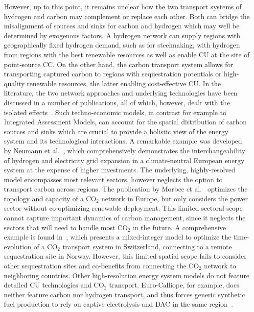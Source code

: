 \documentclass[twocolumn]{article}
\newcommand{\COtwo}{CO$_2$}
\begin{document}
However, up to this point, it remains unclear how the two transport systems of hydrogen and carbon may complement or replace each other. Both can bridge the misalignment of sources and sinks for carbon and hydrogen which may well be determined by exogenous factors. A hydrogen network can supply regions with geographically fixed hydrogen demand, such as for steelmaking, with hydrogen from regions with the best renewable resources as well as enable CU at the site of point-source CC. On the other hand, the carbon transport system allows for transporting captured carbon to regions with sequestration potentials or high-quality renewable resources, the latter enabling cost-effective CU.
In the literature, the two network approaches and underlying technologies have been discussed in a number of publications, all of which, however, dealt with the isolated effects~\cite{bakkenLinearModelsOptimization2008,morbeeOptimisedDeploymentEuropean2012,stewartFeasibilityEuropeanwideIntegrated2014,oeiModelingCarbonCapture2014,elahiMultiperiodLeastCost2014,burandtDecarbonizingChinaEnergy2019,middletonSimCCSOpensourceTool2020,bjerketvedtOptimalDesignCost2020,weiProposedGlobalLayout2021,damoreOptimalDesignEuropean2021,becattiniCarbonDioxideCapture2022,neumannBenefitsHydrogenNetwork2022}. Such techno-economic models, in contrast for example to Integrated Assessment Models, can account for the spatial distribution of carbon sources and sinks which are crucial to provide a holistic view of the energy system and its technological interactions. A remarkable example was developed by Neumann et al.~\cite{neumannBenefitsHydrogenNetwork2022}, which comprehensively demonstrates the interchangeability of hydrogen and electricity grid expansion in a climate-neutral European energy system at the expense of higher investments. The underlying, highly-resolved model encompasses most relevant sectors, however neglects the option to transport carbon across regions.
The publication by Morbee et al.~\cite{morbeeOptimisedDeploymentEuropean2012} optimizes the topology and capacity of a \COtwo{} network in Europe, but only considers the power sector without co-optimizing renewable deployment. This limited sectoral scope cannot capture important dynamics of carbon management, since it neglects the sectors that will need to handle most \COtwo{} in the future.
A comprehensive example is found in~\cite{becattiniCarbonDioxideCapture2022}, which presents a mixed-integer model to optimize the time-evolution of a \COtwo{} transport system in Switzerland, connecting to a remote sequestration site in Norway. However, this limited spatial scope fails to consider other sequestration sites and co-benefits from connecting the \COtwo{} network to neighboring countries.
Other high-resolution energy system models do not feature detailed CU technologies and \COtwo{} transport. Euro-Calliope, for example, does neither feature carbon nor hydrogen transport, and thus forces generic synthetic fuel production to rely on captive electrolysis and DAC in the same region~\cite{pickeringDiversityOptionsEliminate2022}.
\end{document}
